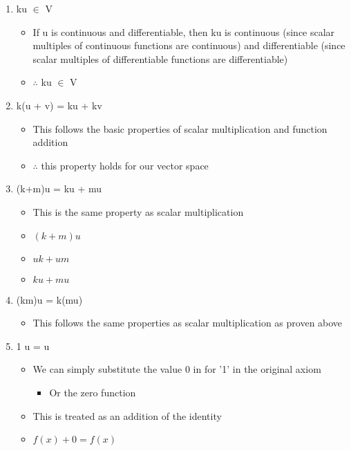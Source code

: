 \documentclass[11pt]{article}
\begin{document}
\begin{enumerate}
\begin{itemize}
\end{itemize}
\item ku \(\in\) V\\
\begin{itemize}
\item If u is continuous and differentiable, then ku is continuous (since scalar multiples of continuous functions are continuous) and differentiable (since scalar multiples of differentiable functions are differentiable)\\
\item \(\therefore\) ku \(\in\) V\\
\end{itemize}
\item k(u + v) = ku + kv\\
\begin{itemize}
\item This follows the basic properties of scalar multiplication and function addition\\
\item \(\therefore\) this property holds for our vector space\\
\end{itemize}
\item (k+m)u = ku + mu\\
\begin{itemize}
\item This is the same property as scalar multiplication\\
\item \((k+m)u\)\\
\item \(uk + um\)\\
\item \(ku + mu\)\\
\end{itemize}
\item (km)u = k(mu)\\
\begin{itemize}
\item This follows the same properties as scalar multiplication as proven above\\
\end{itemize}
\item 1 \texttimes{} u = u\\
\begin{itemize}
\item We can simply substitute the value 0 in for '1' in the original axiom\\
\begin{itemize}
\item Or the zero function\\
\end{itemize}
\item This is treated as an addition of the identity\\
\item \(f(x) + 0 = f(x)\)\\
\end{itemize}
\end{enumerate}
\end{document}
